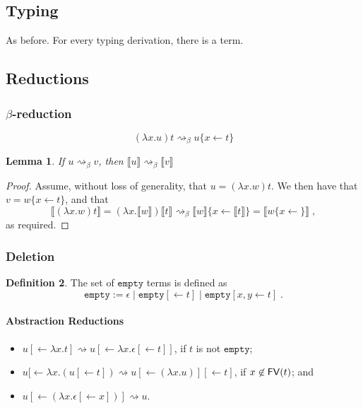 \documentclass[11pt,a4paper]{article}
\theoremstyle{definition}
\newtheorem{definition}{Definition}
\theoremstyle{plain}
\newtheorem{lemma}[definition]{Lemma}
\theoremstyle{remark}
\begin{document}
\subsection{Typing}

As before. For every typing derivation, there is a term.

\subsection{Reductions}

\subsubsection{$\beta$-reduction}

\[
(\lambda x.u)t \rightsquigarrow_\beta u\{x\leftarrow t\}
\]


\begin{lemma}
	If $u\rightsquigarrow_\beta v$, then $\llbracket u\rrbracket \rightsquigarrow_\beta\llbracket v\rrbracket$
\end{lemma}

\begin{proof}
	Assume, without loss of generality, that $u=(\lambda x.w)t$. We then have that $v=w\{x\leftarrow t\}$, and that
	\[
	\llbracket(\lambda x.w)t\rrbracket = (\lambda x.\llbracket w\rrbracket)\llbracket t\rrbracket\rightsquigarrow_\beta\llbracket w\rrbracket\{x\leftarrow\llbracket t\rrbracket\} = \llbracket w\{x\leftarrow\}\rrbracket\;,
	\]
	as required.
\end{proof}

\subsubsection{Deletion}

\newcommand{\tempty}{{\mathtt{empty}}}

\begin{definition}
	The set of $\tempty$ terms is defined as
	\[\tempty:=\epsilon\;|\;\tempty[\leftarrow t]\;|\;\tempty[x,y\leftarrow t]\;.\]
\end{definition}

\paragraph{Abstraction Reductions}

\begin{itemize}
	\item $u[\leftarrow\lambda x.t]\rightsquigarrow u[\leftarrow\lambda x.\epsilon[\leftarrow t]]$, if $t$ is not $\tempty$;
	\item $u[\leftarrow\lambda x.(u[\leftarrow t])\rightsquigarrow u[\leftarrow(\lambda x.u)][\leftarrow t]$, if $x\not\in{\mathop{\mathsf{FV}}}(t)$; and
	\item $u[\leftarrow(\lambda x.\epsilon[\leftarrow x])]\rightsquigarrow u$.
\end{itemize}
\end{document}
